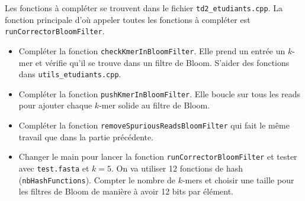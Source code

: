 \documentclass{article}
\begin{document}
Les fonctions à compléter se trouvent dans le fichier \texttt{td2\_etudiants.cpp}. La fonction principale d'où appeler toutes les fonctions à compléter est \texttt{runCorrectorBloomFilter}.
\begin{itemize}
  \item Compléter la fonction \texttt{checkKmerInBloomFilter}. Elle prend un entrée un $k$-mer et vérifie qu'il se trouve dans un filtre de Bloom. S'aider des fonctions dans \texttt{utils\_etudiants.cpp}.\\
  \noindent{}
  \item Compléter la fonction \texttt{pushKmerInBloomFilter}. Elle boucle sur tous les reads pour ajouter chaque $k$-mer solide au filtre de Bloom.\\
 \noindent{}
  \item Compléter la fonction \texttt{removeSpuriousReadsBloomFilter} qui fait le même travail que dans la partie précédente.
  \item Changer le main pour lancer la fonction \texttt{runCorrectorBloomFilter} et tester avec  \texttt{test.fasta} et $k=5$. On va utiliser 12 fonctions de hash (\texttt{nbHashFunctions}). Compter le nombre de $k$-mers et choisir une taille pour les filtres de Bloom de manière à avoir 12 bits par élément.\\
  \noindent{}
 \end{itemize}
 
\end{document}
